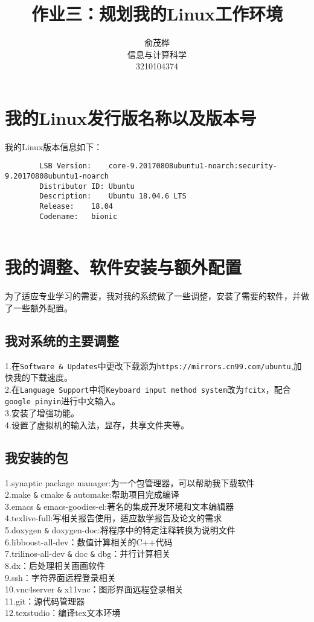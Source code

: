 \documentclass{ctexart}
\title{作业三：规划我的Linux工作环境}
\author{俞茂桦\\信息与计算科学\\3210104374}
\begin{document}
	
	\maketitle
	
	\section{我的Linux发行版名称以及版本号}
	
	我的Linux版本信息如下：
	\begin{verbatim}
		LSB Version:	core-9.20170808ubuntu1-noarch:security-9.20170808ubuntu1-noarch
		Distributor ID:	Ubuntu
		Description:	Ubuntu 18.04.6 LTS
		Release:	18.04
		Codename:	bionic
		
	\end{verbatim}
	\section{我的调整、软件安装与额外配置}
	为了适应专业学习的需要，我对我的系统做了一些调整，安装了需要的软件，并做了一些额外配置。
	\subsection{我对系统的主要调整}
	\begin{flushleft}
	1.在\verb|Software & Updates|中更改下载源为\verb|https://mirrors.cn99.com/ubuntu|,加快我的下载速度。\\
	2.在\verb|Language Support|中将\verb|Keyboard input method system|改为\verb|fcitx|，配合\verb|google pinyin|进行中文输入。\\
	3.安装了增强功能。\\
	4.设置了虚拟机的输入法，显存，共享文件夹等。
	\end{flushleft}
	\subsection{我安装的包}
	\begin{flushleft}
		1.synaptic package manager:为一个包管理器，可以帮助我下载软件\\
		2.make \verb|&| cmake \verb|&| automake:帮助项目完成编译\\
		3.emacs \verb|&| emacs-goodies-el:著名的集成开发环境和文本编辑器\\
		4.texlive-full:写相关报告使用，适应数学报告及论文的需求\\
		5.doxygen \verb|&| doxygen-doc:将程序中的特定注释转换为说明文件\\
		6.libboost-all-dev：数值计算相关的C++代码\\
		7.trilinos-all-dev \verb|&| doc \verb|&| dbg：并行计算相关\\
		8.dx：后处理相关画画软件\\
		9.ssh：字符界面远程登录相关\\
		10.vnc4server \verb|&| x11vnc：图形界面远程登录相关\\
		11.git：源代码管理器\\
		12.texstudio：编译tex文本环境\\
	\end{flushleft}
\end{document}
